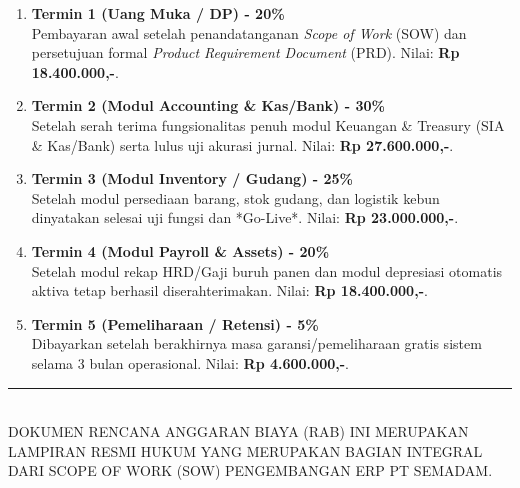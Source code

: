 \documentclass[11pt,a4paper]{article}
\begin{document}
\begin{enumerate}
    \item \textbf{Termin 1 (Uang Muka / DP) - 20\%} \\
    Pembayaran awal setelah penandatanganan \textit{Scope of Work} (SOW) dan persetujuan formal \textit{Product Requirement Document} (PRD). Nilai: \textbf{Rp 18.400.000,-}.
    \item \textbf{Termin 2 (Modul Accounting \& Kas/Bank) - 30\%} \\
    Setelah serah terima fungsionalitas penuh modul Keuangan \& Treasury (SIA \& Kas/Bank) serta lulus uji akurasi jurnal. Nilai: \textbf{Rp 27.600.000,-}.
    \item \textbf{Termin 3 (Modul Inventory / Gudang) - 25\%} \\
    Setelah modul persediaan barang, stok gudang, dan logistik kebun dinyatakan selesai uji fungsi dan *Go-Live*. Nilai: \textbf{Rp 23.000.000,-}.
    \item \textbf{Termin 4 (Modul Payroll \& Assets) - 20\%} \\
    Setelah modul rekap HRD/Gaji buruh panen dan modul depresiasi otomatis aktiva tetap berhasil diserahterimakan. Nilai: \textbf{Rp 18.400.000,-}.
    \item \textbf{Termin 5 (Pemeliharaan / Retensi) - 5\%} \\
    Dibayarkan setelah berakhirnya masa garansi/pemeliharaan gratis sistem selama 3 bulan operasional. Nilai: \textbf{Rp 4.600.000,-}.
\end{enumerate}

\vspace{2cm}

\begin{center}
    \rule{8cm}{0.5pt}\\
    \small\color{gray}DOKUMEN RENCANA ANGGARAN BIAYA (RAB) INI MERUPAKAN LAMPIRAN RESMI HUKUM YANG MERUPAKAN BAGIAN INTEGRAL DARI SCOPE OF WORK (SOW) PENGEMBANGAN ERP PT SEMADAM.
\end{center}
\end{document}
